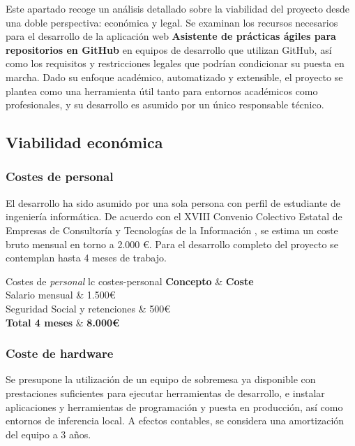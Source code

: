 Este apartado recoge un análisis detallado sobre la viabilidad del proyecto desde una doble perspectiva: económica y legal. Se examinan los recursos necesarios para el desarrollo de la aplicación web \textbf{Asistente de prácticas ágiles para repositorios en GitHub} en equipos de desarrollo que utilizan GitHub, así como los requisitos y restricciones legales que podrían condicionar su puesta en marcha. Dado su enfoque académico, automatizado y extensible, el proyecto se plantea como una herramienta útil tanto para entornos académicos como profesionales, y su desarrollo es asumido por un único responsable técnico.

\subsection{Viabilidad económica}

\subsubsection{Costes de personal}

El desarrollo ha sido asumido por una sola persona con perfil de estudiante de ingeniería informática. De acuerdo con el XVIII Convenio Colectivo Estatal de Empresas de Consultoría y Tecnologías de la Información \cite{boe2023_consultoria}, se estima un coste bruto mensual en torno a 2.000 €. Para el desarrollo completo del proyecto se contemplan hasta 4 meses de trabajo.

\tablaSmallSinColores
{Costes de \textit{personal}}
{lc}
{costes-personal}
{%
	\textbf{Concepto} & \textbf{Coste} \\
}
{%
	Salario mensual & 1.500€ \\
	Seguridad Social y retenciones & 500€ \\
	\midrule
	\textbf{Total 4 meses} & \textbf{8.000€} \\
}

\subsubsection{Coste de hardware}

Se presupone la utilización de un equipo de sobremesa ya disponible con prestaciones suficientes para ejecutar herramientas de desarrollo, e instalar aplicaciones y herramientas de programación y puesta en producción, así como entornos de inferencia local. A efectos contables, se considera una amortización del equipo a 3 años.

